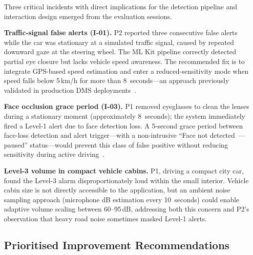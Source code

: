 \documentclass[sigconf]{acmart}
\begin{document}
Three critical incidents with direct implications for the detection pipeline and interaction design emerged from the evaluation sessions.

\textbf{Traffic-signal false alerts (I-01).} P2 reported three consecutive false alerts while the car was stationary at a simulated traffic signal, caused by repeated downward gaze at the steering wheel. The ML Kit pipeline correctly detected partial eye closure but lacks vehicle speed awareness. The recommended fix is to integrate GPS-based speed estimation and enter a reduced-sensitivity mode when speed falls below 5\,km/h for more than 8~seconds---an approach previously validated in production DMS deployments~\cite{ref25}.

\textbf{Face occlusion grace period (I-03).} P1 removed eyeglasses to clean the lenses during a stationary moment (approximately 8~seconds); the system immediately fired a Level-1 alert due to face detection loss. A 5-second grace period between face-loss detection and alert trigger---with a non-intrusive ``Face not detected~--- paused'' status---would prevent this class of false positive without reducing sensitivity during active driving~\cite{ref26}.

\textbf{Level-3 volume in compact vehicle cabins.} P1, driving a compact city car, found the Level-3 alarm disproportionately loud within the small interior. Vehicle cabin size is not directly accessible to the application, but an ambient noise sampling approach (microphone dB estimation every 10~seconds) could enable adaptive volume scaling between 60--95\,dB, addressing both this concern and P2's observation that heavy road noise sometimes masked Level-1 alerts.

\subsection{Prioritised Improvement Recommendations}
\end{document}
